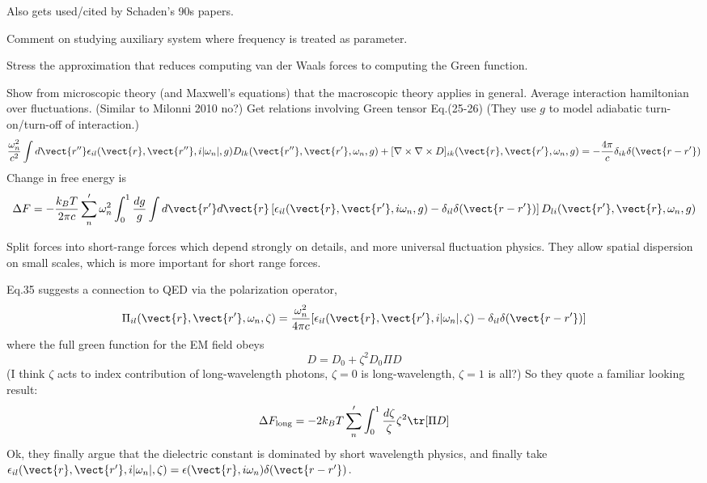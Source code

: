 Also gets used/cited by Schaden's 90s papers.

Comment on studying auxiliary system where frequency is treated as parameter.

Stress the approximation that reduces computing van der Waals forces to computing the Green function.  

Show from microscopic theory (and Maxwell's equations) that the macroscopic 
theory applies in general.
  Average interaction hamiltonian over fluctuations.
  (Similar to Milonni 2010 no?)
  Get relations involving Green tensor   Eq.(25-26)
(They use $g$ to model adiabatic turn-on/turn-off of interaction.)
\begin{equation}
\frac{\omega_n^2}{c^2}\int d\vect{r''} 
\epsilon_{il}(\vect{r},\vect{r''},i|\omega_n|,g)D_{lk}(\vect{r''},\vect{r'},\omega_n,g)
+[\nabla\times\nabla\times D]_{ik}(\vect{r},\vect{r'},\omega_n,g)
 = -\frac{4\pi}{c}\delta_{ik}\delta(\vect{r-r'})
\end{equation}
Change in free energy is 
\begin{equation}
\Delta F = -\frac{k_B T}{2\pi c}\sum_{n}'\omega_n^2\int_0^1\frac{dg}{g}\int d\vect{r'}d\vect{r}
\left[\epsilon_{il}(\vect{r},\vect{r'},i\omega_n,g)
-\delta_{il}\delta(\vect{r-r'})\right]D_{li}(\vect{r'},\vect{r},\omega_n,g)
\end{equation}

Split forces into short-range forces which depend strongly on details,
 and more universal fluctuation physics.
 They allow spatial dispersion on small scales, which is more important for short range forces.  

Eq.35 suggests a connection to QED via the polarization operator, 
\begin{equation}
\Pi_{il}(\vect{r},\vect{r'},\omega_n,\zeta)=\frac{\omega_n^2}{4\pi c}
[\epsilon_{il}(\vect{r},\vect{r'},i|\omega_n|,\zeta)-\delta_{il}\delta(\vect{r-r'})]
\end{equation}
where the full green function for the EM field obeys
\begin{equation}
D = D_0+ \zeta^2D_0\Pi D
\end{equation}
(I think $\zeta$ acts to index contribution of long-wavelength photons,
 $\zeta=0$ is long-wavelength, $\zeta=1$ is all?)
So they quote a familiar looking result: 
\begin{equation}
\Delta F_{\text{long}} =-2k_BT \sum_{n}'\int_0^1 \frac{d\zeta}{\zeta}\zeta^2 \tr[\Pi D]
\end{equation}
Ok, they finally argue that the dielectric constant is dominated by short wavelength physics,
 and finally take $\epsilon_{il}(\vect{r},\vect{r'},i|\omega_n|,\zeta)=\epsilon(\vect{r},i\omega_n)\delta(\vect{r-r'})$.

